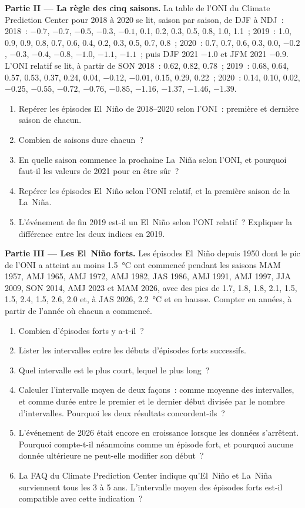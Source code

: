 \begin{problem}
\medskip\noindent\textbf{Partie II --- La règle des cinq saisons.}
La table de l'ONI du Climate Prediction Center pour 2018 à 2020 se lit, saison par saison, de DJF à
NDJ~: 2018~: $-0.7$, $-0.7$, $-0.5$, $-0.3$, $-0.1$, 0.1, 0.2, 0.3, 0.5, 0.8, 1.0, 1.1~; 2019~: 1.0,
0.9, 0.9, 0.8, 0.7, 0.6, 0.4, 0.2, 0.3, 0.5, 0.7, 0.8~; 2020~: 0.7, 0.7, 0.6, 0.3, 0.0, $-0.2$,
$-0.3$, $-0.4$, $-0.8$, $-1.0$, $-1.1$, $-1.1$~; puis DJF 2021 $-1.0$ et JFM 2021 $-0.9$. L'ONI
relatif se lit, à partir de SON 2018~: 0.62, 0.82, 0.78~; 2019~: 0.68, 0.64, 0.57, 0.53, 0.37, 0.24,
0.04, $-0.12$, $-0.01$, 0.15, 0.29, 0.22~; 2020~: 0.14, 0.10, 0.02, $-0.25$, $-0.55$, $-0.72$,
$-0.76$, $-0.85$, $-1.16$, $-1.37$, $-1.46$, $-1.39$.
\begin{enumerate}[resume]
\item Repérer les épisodes El~Niño de 2018--2020 selon l'ONI~: première et dernière saison de chacun.
\item Combien de saisons dure chacun~?
\item En quelle saison commence la prochaine La~Niña selon l'ONI,
      et pourquoi faut-il les valeurs de 2021 pour en être sûr~?
\item Repérer les épisodes El~Niño selon l'ONI relatif, et la première saison de la La~Niña.
\item L'événement de fin 2019 est-il un El~Niño selon l'ONI relatif~? Expliquer
      la différence entre les deux indices en 2019.
\end{enumerate}

\medskip\noindent\textbf{Partie III --- Les El~Niño forts.}
Les épisodes El~Niño depuis 1950 dont le pic de l'ONI a atteint au moins \qty{1.5}{\celsius} ont commencé pendant les saisons
MAM 1957, AMJ 1965, AMJ 1972, AMJ 1982, JAS 1986, AMJ 1991, AMJ 1997, JJA 2009, SON 2014,
AMJ 2023 et MAM 2026, avec des pics de 1.7, 1.8, 1.8, 2.1, 1.5, 1.5, 2.4, 1.5, 2.6, 2.0 et, à
JAS 2026, \qty{2.2}{\celsius} et en hausse. Compter en années, à partir de l'année où chacun a commencé.
\begin{enumerate}[resume]
\item Combien d'épisodes forts y a-t-il~?
\item Lister les intervalles entre les débuts d'épisodes forts successifs.
\item Quel intervalle est le plus court, lequel le plus long~?
\item Calculer l'intervalle moyen de deux façons~: comme moyenne des intervalles, et comme durée entre le premier
      et le dernier début divisée par le nombre d'intervalles. Pourquoi les deux résultats concordent-ils~?
\item L'événement de 2026 était encore en croissance lorsque les données s'arrêtent. Pourquoi compte-t-il néanmoins
      comme un épisode fort, et pourquoi aucune donnée ultérieure ne peut-elle modifier son début~?
\item La FAQ du Climate Prediction Center indique qu'El~Niño et La~Niña surviennent tous les 3 à 5 ans.
      L'intervalle moyen des épisodes forts est-il compatible avec cette indication~?
\end{enumerate}


\end{problem}
